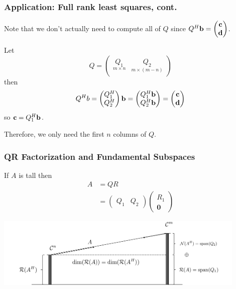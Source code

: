 \documentclass{beamer}
\begin{document}
\begin{frame}\frametitle{Application: Full rank least squares, cont.}
	Note that we don't actually need to compute all of $Q$ since $Q^H\mathbf{b} = \begin{pmatrix}\mathbf{c}\\\mathbf{d}\end{pmatrix}$.
	
	Let 
	\[
		Q = \begin{pmatrix} 
				\underset{m\times n}{Q_1} & \underset{m\times (m-n)}{Q_2} 
			\end{pmatrix}
	\]
	then
	\[
		Q^Hb = \begin{pmatrix}
 					Q_1^H \\
 					Q_2^H
 			   \end{pmatrix} \mathbf{b}
 			 = \begin{pmatrix}
 					Q_1^H \mathbf{b} \\
 					Q_2^H \mathbf{b}
 				\end{pmatrix}
 			= \begin{pmatrix}
 				\mathbf{c} \\ 
 				\mathbf{d}
 			  \end{pmatrix}
	\]
	so $\mathbf{c} = Q_1^H\mathbf{b}$.
	
	\vfill
	
	Therefore, we only need the first $n$ columns of $Q$.
\end{frame}

\begin{frame}\frametitle{QR Factorization and Fundamental Subspaces}

	If $A$ is tall then
	\begin{align*}
		A &= QR \\
  		  &= \begin{pmatrix} 
  		  		Q_1 & Q_2 
  		  	  \end{pmatrix}
  		  	  \begin{pmatrix} 
  		  	  	R_1 \\ \mathbf{0} 
  		  	  \end{pmatrix}	
	\end{align*}

	
	\begin{center}
	\includegraphics[width=0.9\textwidth]{figures/chap5_qr_subspaces}
	\end{center}

	
\end{frame}
\end{document}
